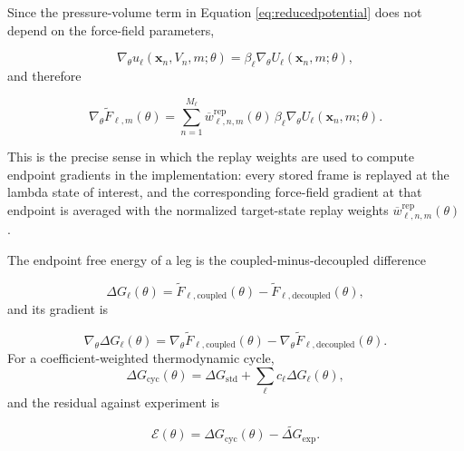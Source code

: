 Since the pressure-volume term in Equation \eqref{eq:reducedpotential} does not depend on the force-field parameters,

\begin{equation}
    \nabla_\theta
    u_\ell(\mathbf{x}_n, V_n, m; \theta)
    =
    \beta_\ell
    \nabla_\theta
    U_\ell(\mathbf{x}_n, m; \theta),
    \label{eq:gradreduced}
\end{equation}
%
and therefore

\begin{equation}
    \nabla_\theta \widetilde{F}_{\ell,m}(\theta)
    =
    \sum_{n=1}^{M_\ell}
    \overline{w}^{\mathrm{rep}}_{\ell,n,m}(\theta)
    \,
    \beta_\ell
    \nabla_\theta
    U_\ell(\mathbf{x}_n, m; \theta).
    \label{eq:fgradtheta}
\end{equation}

This is the precise sense in which the replay weights are used to compute endpoint gradients in the implementation: every stored frame is replayed at the lambda state of interest, and the corresponding force-field gradient at that endpoint is averaged with the normalized target-state replay weights $\overline{w}^{\mathrm{rep}}_{\ell,n,m}(\theta)$.

The endpoint free energy of a leg is the coupled-minus-decoupled difference

\begin{equation}
    \Delta G_\ell(\theta)
    =
    \widetilde{F}_{\ell,\mathrm{coupled}}(\theta)
    -
    \widetilde{F}_{\ell,\mathrm{decoupled}}(\theta),
    \label{eq:legdg}
\end{equation}
%
and its gradient is

\begin{equation}
    \nabla_\theta \Delta G_\ell(\theta)
    =
    \nabla_\theta \widetilde{F}_{\ell,\mathrm{coupled}}(\theta)
    -
    \nabla_\theta \widetilde{F}_{\ell,\mathrm{decoupled}}(\theta).
    \label{eq:legdggrad}
\end{equation}
For a coefficient-weighted thermodynamic cycle,
\begin{equation}
    \Delta G_{\mathrm{cyc}}(\theta)
    =
    \Delta G_{\mathrm{std}}
    +
    \sum_\ell c_\ell \Delta G_\ell(\theta),
    \label{eq:cycle}
\end{equation}
%
and the residual against experiment is

\begin{equation}
    \mathcal{E}(\theta)
    =
    \Delta G_{\mathrm{cyc}}(\theta)
    -
    \widetilde{\Delta G}_{\mathrm{exp}}.
    \label{eq:residual}
\end{equation}

